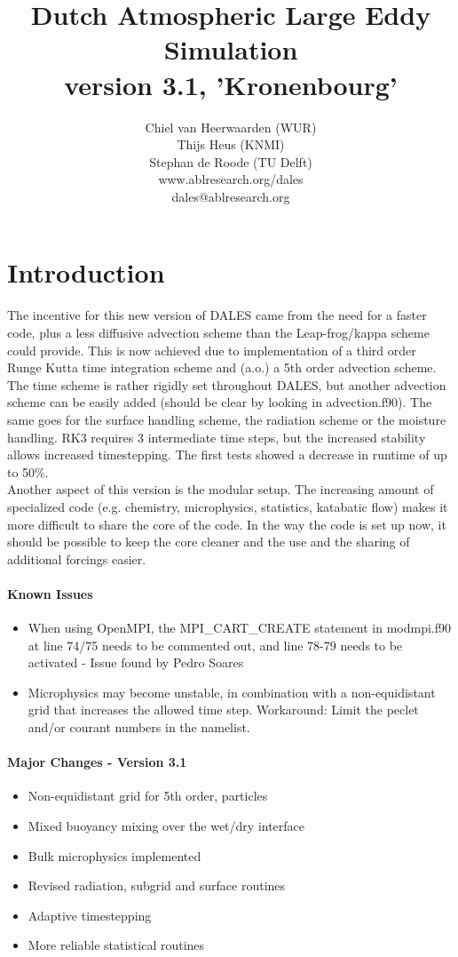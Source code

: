 \documentclass[a4paper,10pt]{article}
\title{Dutch Atmospheric Large Eddy Simulation\\
version 3.1, 'Kronenbourg'
}
\author{Chiel van Heerwaarden (WUR)\\ Thijs Heus (KNMI)\\ Stephan de Roode (TU Delft)\\www.ablresearch.org/dales\\
dales@ablresearch.org}
\begin{document}

\maketitle
\tableofcontents
\section{Introduction}
The incentive for this new version of DALES came from the need for a faster code, plus a less diffusive advection scheme than the Leap-frog/kappa scheme could provide. This is now achieved due to implementation of a third order Runge Kutta time integration scheme and (a.o.) a 5th order advection scheme. The time scheme is rather rigidly set throughout DALES, but another advection scheme can be easily added (should be clear by looking in advection.f90). The same goes for the surface handling scheme, the radiation scheme or the moisture handling.
RK3 requires 3 intermediate time steps, but the increased stability allows increased timestepping. The first tests showed a decrease in runtime of up to 50\%.\\
Another aspect of this version is the modular setup. The increasing amount of specialized code (e.g. chemistry, microphysics, statistics, katabatic flow) makes it more difficult to share the core of the code. In the way the code is set up now, it should be possible to keep the core cleaner and the use and the sharing of additional forcings easier.


\paragraph{Known Issues}
\begin{itemize}
 \item When using OpenMPI, the MPI\_CART\_CREATE statement in modmpi.f90 at line 74/75 needs to be commented out, and line 78-79 needs to be activated - Issue found by Pedro Soares
\item Microphysics may become unstable, in combination with a non-equidistant grid that increases the allowed time step. Workaround: Limit the peclet and/or courant numbers in the namelist.
\end{itemize}

\paragraph{Major Changes - Version 3.1}
\begin{itemize}
 \item Non-equidistant grid for 5th order, particles
\item Mixed buoyancy mixing over the wet/dry interface
\item Bulk microphysics implemented
\item Revised radiation, subgrid and surface routines
\item Adaptive timestepping
\item More reliable statistical routines
\end{itemize}
\end{document}
